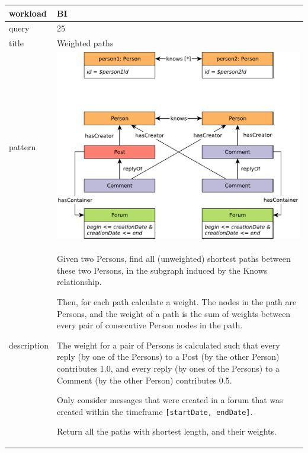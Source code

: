 \renewcommand*{\arraystretch}{1.1}

\noindent\begin{tabularx}{17cm}{|p{1.95cm}|X|}
	\hline
	workload    & BI \\ \hline
%
	query       & 25 \\ \hline
%
	title       & Weighted paths \\ \hline
%
    pattern     & \hfill\includegraphics[scale=\patternscale,margin=0cm .2cm]{patterns/bi-read-25}\hfill\vadjust{} \\ \hline
%
	description & Given two Persons, find all (unweighted) shortest paths between these
two Persons, in the subgraph induced by the Knows relationship.

Then, for each path calculate a weight. The nodes in the path are
Persons, and the weight of a path is the sum of weights between every
pair of consecutive Person nodes in the path.

The weight for a pair of Persons is calculated such that every reply (by
one of the Persons) to a Post (by the other Person) contributes 1.0, and
every reply (by ones of the Persons) to a Comment (by the other Person)
contributes 0.5.

Only consider messages that were created in a forum that was created
within the timeframe \texttt{{[}startDate,\ endDate{]}}.

Return all the paths with shortest length, and their weights.
 \\ \hline
%
	

\end{tabularx}
